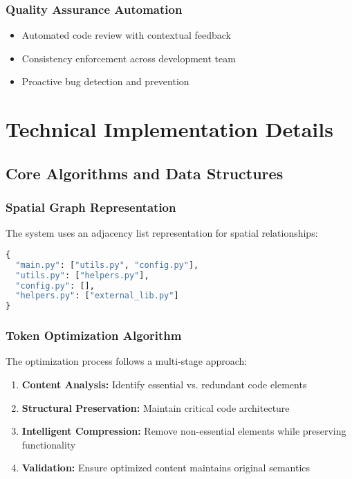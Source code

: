 \documentclass[12pt,a4paper]{article}
\begin{document}
\subsubsection{Quality Assurance Automation}
\begin{itemize}
    \item Automated code review with contextual feedback
    \item Consistency enforcement across development team
    \item Proactive bug detection and prevention
\end{itemize}

\section{Technical Implementation Details}

\subsection{Core Algorithms and Data Structures}

\subsubsection{Spatial Graph Representation}
The system uses an adjacency list representation for spatial relationships:
\begin{lstlisting}[language=Python, caption=Spatial Graph Structure]
{
  "main.py": ["utils.py", "config.py"],
  "utils.py": ["helpers.py"],
  "config.py": [],
  "helpers.py": ["external_lib.py"]
}
\end{lstlisting}

\subsubsection{Token Optimization Algorithm}
The optimization process follows a multi-stage approach:
\begin{enumerate}
    \item \textbf{Content Analysis:} Identify essential vs. redundant code elements
    \item \textbf{Structural Preservation:} Maintain critical code architecture
    \item \textbf{Intelligent Compression:} Remove non-essential elements while preserving functionality
    \item \textbf{Validation:} Ensure optimized content maintains original semantics
\end{enumerate}
\end{document}
